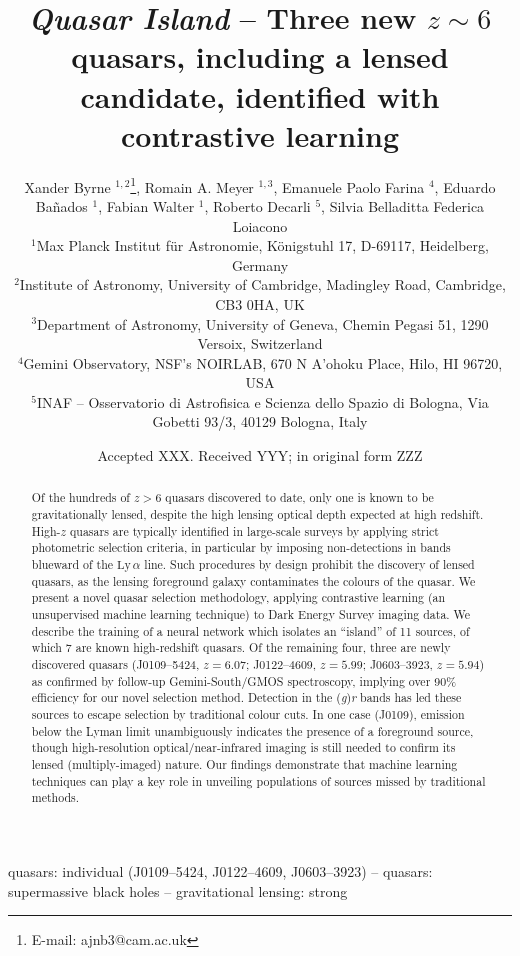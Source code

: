 \documentclass[fleqn,usenatbib]{mnras}
\title[
    \textit{Quasar Island} -- Three new $z\sim$ 6 quasars
]{
    \textit{Quasar Island} -- Three new $z\sim6$ quasars, including a lensed candidate, identified with contrastive learning
}
\author[X. Byrne et\ al.]{
Xander Byrne \orcidlink{0000-0001-9488-238X}$^{1,2}$\thanks{E-mail: ajnb3@cam.ac.uk},
Romain A. Meyer \orcidlink{0000-0001-5492-4522}$^{1,3}$,
Emanuele Paolo Farina \orcidlink{0000-0002-6822-2254}$^{4}$,
Eduardo Ba\~{n}ados \orcidlink{0000-0002-2931-7824}$^{1}$,
\newauthor
Fabian Walter \orcidlink{0000-0003-4793-7880}$^{1}$,
Roberto Decarli \orcidlink{0000-0002-2662-8803}$^{5}$,
Silvia Belladitta%
Federica Loiacono%
\\
$^{1}$Max Planck Institut f\"{u}r Astronomie, K\"{o}nigstuhl 17, D-69117, Heidelberg, Germany\\
$^{2}$Institute of Astronomy, University of Cambridge, Madingley Road, Cambridge, CB3 0HA, UK\\
$^{3}$Department of Astronomy, University of Geneva, Chemin Pegasi 51, 1290 Versoix, Switzerland\\
$^{4}$Gemini Observatory, NSF's NOIRLAB, 670 N A'ohoku Place, Hilo, HI 96720, USA\\
$^{5}$INAF -- Osservatorio di Astrofisica e Scienza dello Spazio di Bologna, Via Gobetti 93/3, 40129 Bologna, Italy
}
\date{Accepted XXX. Received YYY; in original form ZZZ}
\begin{document}
\label{firstpage}
\pagerange{\pageref{firstpage}--\pageref{lastpage}}
\maketitle

\begin{abstract}
Of the hundreds of $z>6$ quasars discovered to date, only one is known to be gravitationally lensed, despite the high lensing optical depth expected at high redshift.
High-$z$ quasars are typically identified in large-scale surveys by applying strict photometric selection criteria, in particular by imposing non-detections in bands blueward of the $\text{Ly}\,\alpha$ line.
Such procedures by design prohibit the discovery of lensed quasars, as the lensing foreground galaxy contaminates the colours of the quasar.
We present a novel quasar selection methodology, applying contrastive learning (an unsupervised machine learning technique) to Dark Energy Survey imaging data.
We describe the training of a neural network which isolates an ``island'' of 11 sources, of which 7 are known high-redshift quasars.
Of the remaining four, three are newly discovered quasars (J0109--5424, $z=6.07$; J0122--4609, $z=5.99$; J0603--3923, $z=5.94$) as confirmed by follow-up Gemini-South/GMOS spectroscopy, implying over 90\% efficiency for our novel selection method.
Detection in the (\textit{g})\textit{r} bands has led these sources to escape selection by traditional colour cuts.
In one case (J0109), emission below the Lyman limit unambiguously indicates the presence of a foreground source, though high-resolution optical/near-infrared imaging is still needed to confirm its lensed (multiply-imaged) nature.
Our findings demonstrate that machine learning techniques can play a key role in unveiling populations of sources missed by traditional methods.
\end{abstract}

\begin{keywords}
quasars: individual (J0109--5424, J0122--4609, J0603--3923)
-- quasars: supermassive black holes
-- gravitational lensing: strong
\end{keywords}


\end{document}
